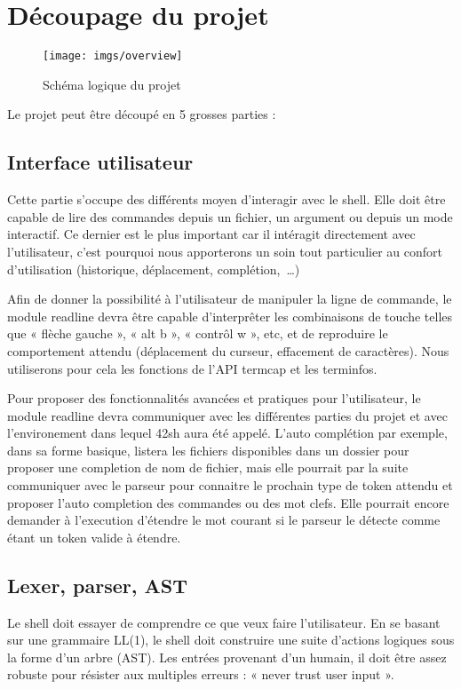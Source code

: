 \section{Découpage du projet}
\begin{sidewaysfigure}[ftbp]
    \texttt{[image: imgs/overview]}
    \caption{Schéma logique du projet}
\end{sidewaysfigure}

Le projet peut être découpé en 5 grosses parties :
\subsection{Interface utilisateur}

Cette partie s'occupe des différents moyen d'interagir avec le shell. Elle doit
être capable de lire des commandes depuis un fichier, un argument ou depuis un
mode interactif. Ce dernier est le plus important car il intéragit directement
avec l'utilisateur, c'est pourquoi nous apporterons un soin tout particulier au
confort d'utilisation (historique, déplacement, complétion,~\dots)

Afin de donner la possibilité à l'utilisateur de manipuler la ligne de commande,
le module readline devra être capable d'interprêter les combinaisons de touche
telles que « flèche gauche », « alt b », « contrôl w », etc, et de reproduire le
comportement attendu (déplacement du curseur, effacement de caractères). Nous
utiliserons pour cela les fonctions de l'API termcap et les terminfos.

Pour proposer des fonctionnalités avancées et pratiques pour l'utilisateur, le
module readline devra communiquer avec les différentes parties du projet et avec
l'environement dans lequel 42sh aura été appelé. L'auto complétion par exemple,
dans sa forme basique, listera les fichiers disponibles dans un dossier pour
proposer une completion de nom de fichier, mais elle pourrait par la suite
communiquer avec le parseur pour connaitre le prochain type de token attendu
et proposer l'auto completion des commandes ou des mot clefs. Elle pourrait
encore demander à l'execution d'étendre le mot courant si le parseur le détecte
comme étant un token valide à étendre.

\subsection{Lexer, parser, AST}

Le shell doit essayer de comprendre ce que veux faire l'utilisateur. En se
basant sur une grammaire LL(1), le shell doit construire une suite d'actions
logiques sous la forme d'un arbre (AST). Les entrées provenant d'un humain, il
doit être assez robuste pour résister aux multiples erreurs : « never trust
user input ».

